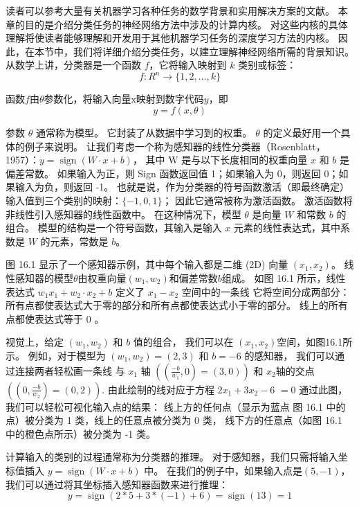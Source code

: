 读者可以参考大量有关机器学习各种任务的数学背景和实用解决方案的文献。 
本章的目的是介绍分类任务的神经网络方法中涉及的计算内核。 
对这些内核的具体理解将使读者能够理解和开发用于其他机器学习任务的深度学习方法的内核。 
因此，在本节中，我们将详细介绍分类任务，以建立理解神经网络所需的背景知识。 
从数学上讲，分类器是一个函数 $f$，它将输入映射到 $k$ 类别或标签：
$$
f: R^{n} \rightarrow\{1,2, \ldots, k\}
$$

函数$f$由$\theta$参数化，将输入向量$\mathrm{x}$映射到数字代码$y$，即
$$
y=f(x, θ)
$$

参数 $\theta$ 通常称为模型。 它封装了从数据中学习到的权重。 $\theta$ 的定义最好用一个具体的例子来说明。 
让我们考虑一个称为感知器的线性分类器（Rosenblatt，1957）：$y=\operatorname{sign}(W \cdot x+b)$，
其中 $\mathrm{W}$ 是与以下长度相同的权重向量 $x$ 和 $b$ 是偏差常数。 
如果输入为正，则 Sign 函数返回值 1；如果输入为 0，则返回 0；如果输入为负，则返回 -1。 
也就是说，作为分类器的符号函数激活（即最终确定）输入值到三个类别的映射：$\{-1,0,1\}$； 因此它通常被称为激活函数。 
激活函数将非线性引入感知器的线性函数中。 在这种情况下，模型 $\theta$ 是向量 $W$ 和常数 $b$ 的组合。 
模型的结构是一个符号函数，其输入是输入 $x$ 元素的线性表达式，其中系数是 $W$ 的元素，常数是 $b$。

图 16.1 显示了一个感知器示例，其中每个输入都是二维 (2D) 向量 $\left(x_{1}, x_{2}\right)$。 
线性感知器的模型$\theta$由权重向量$\left(w_{1}, w_{2}\right)$和偏差常数$b$组成。 
如图 16.1 所示，线性表达式 $w_{1} x_{1}+w_{2} \cdot x_{2}+b$ 
定义了 $x_{1}-x_{2}$ 空间中的一条线 它将空间分成两部分：所有点都使表达式大于零的部分和所有点都使表达式小于零的部分。 
线上的所有点都使表达式等于 0 。

视觉上，给定 $\left(w_{1}, w_{2}\right)$ 和 $b$ 值的组合，
我们可以在 $\left(x_{1}, x_{2}\right)$空间，如图16.1所示。 
例如，对于模型为 $\left(w_{1}, w_{2}\right)=(2,3)$ 和 $b=-6$ 的感知器，
我们可以通过连接两者轻松画一条线 与 $x_{1}$ 轴 $\left(\left(\frac{-b}{w_{1}}, 0\right)=(3,0)\right)$ 
和 $x_{2}$轴的交点$\left(\left(0, \frac{-b}{w_{2}}\right)=(0,2)\right)$. 
由此绘制的线对应于方程 $2 x_{1}+3 x_{2}-6$ $=0$ 通过此图，我们可以轻松可视化输入点的结果： 
线上方的任何点（显示为蓝点 图 16.1 中的点）被分类为 1 类，线上的任意点被分类为 0 类，
线下方的任意点（如图 16.1 中的橙色点所示）被分类为 -1 类。

计算输入的类别的过程通常称为分类器的推理。 
对于感知器，我们只需将输入坐标值插入 $y=\operatorname{sign}(W \cdot x+b)$ 中。 
在我们的例子中，如果输入点是$(5,-1)$，我们可以通过将其坐标插入感知器函数来进行推理：
$$
y=\operatorname{sign}(2 * 5+3 *(-1)+6)=\operatorname{sign}(13)=1
$$


